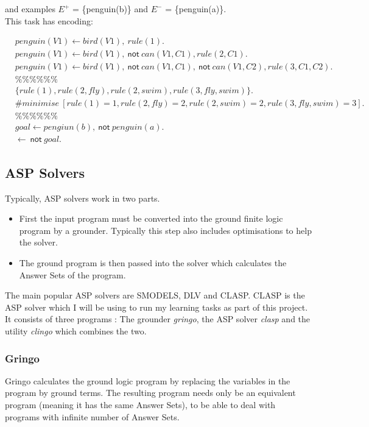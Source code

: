 and examples $E^+$ = \{penguin(b)\} and $E^-$ = \{penguin(a)\}. \\
This task has encoding:

\begin{align*}
&penguin(V1) \gets bird(V1), \: rule(1).\\
&penguin(V1) \gets bird(V1), \: \textsf{not} \: can(V1, C1), rule(2, C1).\\
&penguin(V1) \gets bird(V1), \: \textsf{not} \: can(V1, C1), \: \textsf{not} \: can(V1, C2), rule(3, C1, C2).\\
&\%\%\%\%\%\%\\
&\{rule(1), rule(2, fly), rule(2, swim), rule(3, fly, swim)\}.\\
&\#minimise \: [rule(1)=1, rule(2, fly) = 2, rule(2, swim) = 2, rule(3, fly, swim) = 3]. \\
&\%\%\%\%\%\%\\
&goal \gets pengiun(b), \: \textsf{not} \: penguin(a).\\
&\gets \: \textsf{not} \: goal.
\end{align*}

\subsection{ASP Solvers}

Typically, ASP solvers work in two parts.

\begin{itemize}
\item First the input program must be converted into the ground finite logic program by a grounder. Typically this step also includes optimisations to help the solver.
\item The ground program is then passed into the solver which calculates the Answer Sets of the program.
\end{itemize}

The main popular ASP solvers are SMODELS, DLV and CLASP. CLASP is the ASP solver which I will be using to run my learning tasks as part of this project. It consists of three programs : The grounder \textit{gringo}, the ASP solver \textit{clasp} and the utility \textit{clingo} which combines the two.

\subsubsection{Gringo}

Gringo calculates the ground logic program by replacing the variables in the program by ground terms. The resulting program needs only be an equivalent program (meaning it has the same Answer Sets), to be able to deal with programs with infinite number of Answer Sets.


